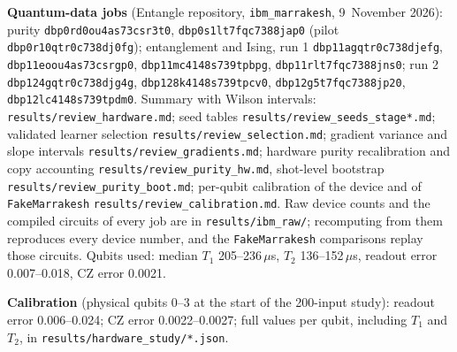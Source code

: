 \documentclass[11pt]{article}
\begin{document}
\textbf{Quantum-data jobs} (Entangle repository, \texttt{ibm\_marrakesh}, 9~November 2026): purity \texttt{dbp0rd0ou4as73csr3t0}, \texttt{dbp0s1lt7fqc7388jap0} (pilot \texttt{dbp0r10qtr0c738dj0fg}); entanglement and Ising, run 1 \texttt{dbp11agqtr0c738djefg}, \texttt{dbp11eoou4as73csrgp0}, \texttt{dbp11mc4148s739tpbpg}, \texttt{dbp11rlt7fqc7388jns0}; run 2 \texttt{dbp124gqtr0c738djg4g}, \texttt{dbp128k4148s739tpcv0}, \texttt{dbp12g5t7fqc7388jp20}, \texttt{dbp12lc4148s739tpdm0}. Summary with Wilson intervals: \texttt{results/review\_hardware.md}; seed tables \texttt{results/review\_seeds\_stage*.md}; validated learner selection \texttt{results/review\_selection.md}; gradient variance and slope intervals \texttt{results/review\_gradients.md}; hardware purity recalibration and copy accounting \texttt{results/review\_purity\_hw.md}, shot-level bootstrap \texttt{results/review\_purity\_boot.md}; per-qubit calibration of the device and of \texttt{FakeMarrakesh} \texttt{results/review\_calibration.md}. Raw device counts and the compiled circuits of every job are in \texttt{results/ibm\_raw/}; recomputing from them reproduces every device number, and the \texttt{FakeMarrakesh} comparisons replay those circuits. Qubits used: median $T_1$ 205--236\,$\mu$s, $T_2$ 136--152\,$\mu$s, readout error 0.007--0.018, CZ error 0.0021.

\textbf{Calibration} (physical qubits 0--3 at the start of the 200-input study): readout error 0.006--0.024; CZ error 0.0022--0.0027; full values per qubit, including $T_1$ and $T_2$, in \texttt{results/hardware\_study/*.json}.
\end{document}
